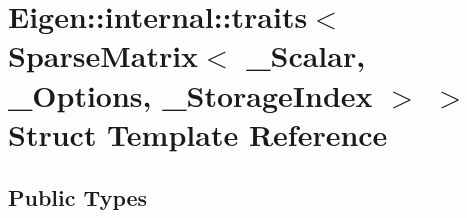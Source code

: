 \hypertarget{struct_eigen_1_1internal_1_1traits_3_01_sparse_matrix_3_01___scalar_00_01___options_00_01___storage_index_01_4_01_4}{}\section{Eigen\+::internal\+::traits$<$ Sparse\+Matrix$<$ \+\_\+\+Scalar, \+\_\+\+Options, \+\_\+\+Storage\+Index $>$ $>$ Struct Template Reference}
\label{struct_eigen_1_1internal_1_1traits_3_01_sparse_matrix_3_01___scalar_00_01___options_00_01___storage_index_01_4_01_4}
\subsection*{Public Types}
